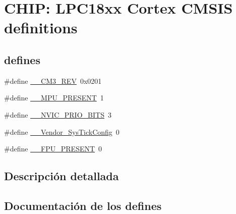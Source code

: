 \hypertarget{group___c_m_s_i_s__18_x_x___c_o_m_m_o_n}{}\section{C\+H\+IP\+: L\+P\+C18xx Cortex C\+M\+S\+IS definitions}
\label{group___c_m_s_i_s__18_x_x___c_o_m_m_o_n}
\subsection*{\textquotesingle{}defines\textquotesingle{}}
\begin{DoxyCompactItemize}
\item 
\#define \hyperlink{group___c_m_s_i_s__18_x_x___c_o_m_m_o_n_gac6a3f185c4640e06443c18b3c8d93f53}{\+\_\+\+\_\+\+C\+M3\+\_\+\+R\+EV}~0x0201
\item 
\#define \hyperlink{group___c_m_s_i_s__18_x_x___c_o_m_m_o_n_ga4127d1b31aaf336fab3d7329d117f448}{\+\_\+\+\_\+\+M\+P\+U\+\_\+\+P\+R\+E\+S\+E\+NT}~1
\item 
\#define \hyperlink{group___c_m_s_i_s__18_x_x___c_o_m_m_o_n_gae3fe3587d5100c787e02102ce3944460}{\+\_\+\+\_\+\+N\+V\+I\+C\+\_\+\+P\+R\+I\+O\+\_\+\+B\+I\+TS}~3
\item 
\#define \hyperlink{group___c_m_s_i_s__18_x_x___c_o_m_m_o_n_gab58771b4ec03f9bdddc84770f7c95c68}{\+\_\+\+\_\+\+Vendor\+\_\+\+Sys\+Tick\+Config}~0
\item 
\#define \hyperlink{group___c_m_s_i_s__18_x_x___c_o_m_m_o_n_gac1ba8a48ca926bddc88be9bfd7d42641}{\+\_\+\+\_\+\+F\+P\+U\+\_\+\+P\+R\+E\+S\+E\+NT}~0
\end{DoxyCompactItemize}


\subsection{Descripción detallada}


\subsection{Documentación de los \textquotesingle{}defines\textquotesingle{}}
